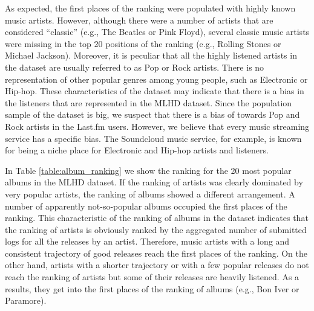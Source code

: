 As expected, the first places of the ranking were populated with highly known music artists. However, although there were a number of artists that are considered ``classic'' (e.g., The Beatles or Pink Floyd), several classic music artists were missing in the top 20 positions of the ranking (e.g., Rolling Stones or Michael Jackson). 
Moreover, it is peculiar that all the highly listened artists in the dataset are usually referred to as Pop or Rock artists. There is no representation of other popular genres among young people, such as Electronic or Hip-hop. 
These characteristics of the dataset may indicate that there is a bias in the listeners that are represented in the MLHD dataset. Since the population sample of the dataset is big, we suspect that there is a bias of towards Pop and Rock artists in the Last.fm users. However, we believe that every music streaming service has a specific bias. The Soundcloud music service, for example, is known for being a niche place for Electronic and Hip-hop artists and listeners.





In Table \ref{table:album_ranking} we show the ranking for the 20 most popular albums in the MLHD dataset. 
If the ranking of artists was clearly dominated by very popular artists, the ranking of albums showed a different arrangement. A number of apparently not-so-popular albums occupied the first places of the ranking. 
This characteristic of the ranking of albums in the dataset indicates that the ranking of artists is obviously ranked by the aggregated number of submitted logs for all the releases by an artist. Therefore, music artists with a long and consistent trajectory of good releases reach the first places of the ranking. 
On the other hand, artists with a shorter trajectory or with a few popular releases do not reach the ranking of artists but some of their releases are heavily listened. As a results, they get into the first places of the ranking of albums (e.g., Bon Iver or Paramore).

